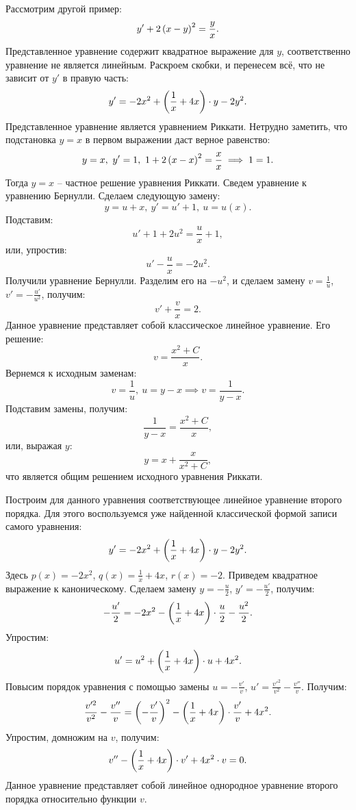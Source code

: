 		Рассмотрим другой пример:
		\[ y' + 2 \left( x - y \right)^2 = \frac{y}{x}. \]
		Представленное уравнение содержит квадратное выражение для $y$, соответственно уравнение не является линейным. Раскроем скобки, и перенесем всё, что не зависит от $y'$ в правую часть:
		\[ y' = -2x^2 + \left( \frac{1}{x} + 4x \right) \cdot y - 2y^2. \]
		Представленное уравнение является уравнением Риккати. Нетрудно заметить, что подстановка $y = x$ в первом выражении даст верное равенство:
		\[ y = x, ~ y' = 1, ~ 1 + 2 \left( x - x \right)^2 = \frac{x}{x} \implies 1 = 1. \]
		Тогда $y = x$ -- частное решение уравнения Риккати. Сведем уравнение к уравнению Бернулли. Сделаем следующую замену:
		\[ y = u + x, ~ y' = u' + 1, ~ u = u(x). \]
		Подставим:
		\[ u' + 1 + 2 u^2 = \frac{u}{x} + 1, \]
		или, упростив:
		\[ u' - \frac{u}{x} = -2u^2. \]
		Получили уравнение Бернулли. Разделим его на $-u^2$, и сделаем замену $v = \frac{1}{u}$, $v' = - \frac{u'}{u^2}$, получим:
		\[ v' + \frac{v}{x} = 2. \]
		Данное уравнение представляет собой классическое линейное уравнение. Его решение:
		\[ v = \frac{x^2 + C}{x}. \]
		Вернемся к исходным заменам:
		\[ v = \frac{1}{u}, ~ u = y - x \implies v = \frac{1}{y - x}. \]
		Подставим замены, получим:
		\[ \frac{1}{y - x} = \frac{x^2 + C}{x}, \]
		или, выражая $y$:
		\[ y = x + \frac{x}{x^2 + C}, \]
		что является общим решением исходного уравнения Риккати.

		Построим для данного уравнения соответствующее линейное уравнение второго порядка. Для этого воспользуемся уже найденной классической формой записи самого уравнения:
		\[ y' = -2x^2 + \left( \frac{1}{x} + 4x \right) \cdot y - 2y^2. \]
		Здесь $p(x) = -2x^2$, $q(x) = \frac{1}{x} + 4x$, $r(x) = -2$. Приведем квадратное выражение к каноническому. Сделаем замену $y = -\frac{u}{2}$, $y' = -\frac{u'}{2}$, получим:
		\[ -\frac{u'}{2} = - 2x^2 - \left( \frac{1}{x} + 4x \right) \cdot \frac{u}{2} - \frac{u^2}{2}. \]
		Упростим:
		\[ u' = u^2 + \left( \frac{1}{x} + 4x \right) \cdot u + 4x^2. \]
		Повысим порядок уравнения с помощью замены $u = -\frac{v'}{v}$, $u' = \frac{v'^2}{v^2} - \frac{v''}{v}$. Получим:
		\[ \frac{v'^2}{v^2} - \frac{v''}{v} = \left( -\frac{v'}{v} \right)^2 - \left( \frac{1}{x} + 4x \right) \cdot \frac{v'}{v} + 4x^2. \]
		Упростим, домножим на $v$, получим:
		\[ v'' - \left( \frac{1}{x} + 4x \right) \cdot v' + 4x^2 \cdot v = 0. \]
		Данное уравнение представляет собой линейное однородное уравнение второго порядка относительно функции $v$.

	\pagebreak